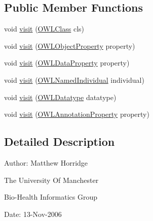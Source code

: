 \subsection*{Public Member Functions}
\begin{DoxyCompactItemize}
\item 
void \hyperlink{interfaceorg_1_1semanticweb_1_1owlapi_1_1model_1_1_o_w_l_entity_visitor_ad5179f51971c652c1e7a27a124eb0697}{visit} (\hyperlink{interfaceorg_1_1semanticweb_1_1owlapi_1_1model_1_1_o_w_l_class}{O\-W\-L\-Class} cls)
\item 
void \hyperlink{interfaceorg_1_1semanticweb_1_1owlapi_1_1model_1_1_o_w_l_entity_visitor_a14a8f6a640984d64525364144289cf1a}{visit} (\hyperlink{interfaceorg_1_1semanticweb_1_1owlapi_1_1model_1_1_o_w_l_object_property}{O\-W\-L\-Object\-Property} property)
\item 
void \hyperlink{interfaceorg_1_1semanticweb_1_1owlapi_1_1model_1_1_o_w_l_entity_visitor_a92af17e530af4ac0c3cf5c1d3c087d3b}{visit} (\hyperlink{interfaceorg_1_1semanticweb_1_1owlapi_1_1model_1_1_o_w_l_data_property}{O\-W\-L\-Data\-Property} property)
\item 
void \hyperlink{interfaceorg_1_1semanticweb_1_1owlapi_1_1model_1_1_o_w_l_entity_visitor_ace916a79bce1e26bdefae9b38f05f8dd}{visit} (\hyperlink{interfaceorg_1_1semanticweb_1_1owlapi_1_1model_1_1_o_w_l_named_individual}{O\-W\-L\-Named\-Individual} individual)
\item 
void \hyperlink{interfaceorg_1_1semanticweb_1_1owlapi_1_1model_1_1_o_w_l_entity_visitor_a99866257be836f3706ad356b94c2bc73}{visit} (\hyperlink{interfaceorg_1_1semanticweb_1_1owlapi_1_1model_1_1_o_w_l_datatype}{O\-W\-L\-Datatype} datatype)
\item 
void \hyperlink{interfaceorg_1_1semanticweb_1_1owlapi_1_1model_1_1_o_w_l_entity_visitor_a9f6fdb29af318df3ae9cef144230e546}{visit} (\hyperlink{interfaceorg_1_1semanticweb_1_1owlapi_1_1model_1_1_o_w_l_annotation_property}{O\-W\-L\-Annotation\-Property} property)
\end{DoxyCompactItemize}


\subsection{Detailed Description}
Author\-: Matthew Horridge\par
 The University Of Manchester\par
 Bio-\/\-Health Informatics Group\par
 Date\-: 13-\/\-Nov-\/2006\par
\par
 

